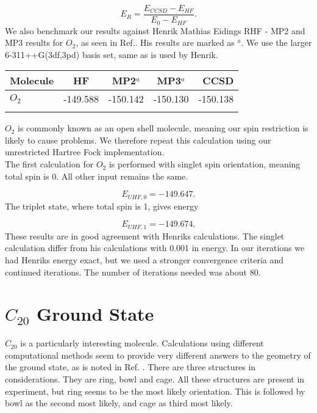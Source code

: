 \begin{equation}
E_R = \frac{E_{CCSD} - E_{HF}}{E_0 - E_{HF}} .
\end{equation}
We also benchmark our results against Henrik Mathias Eidings RHF - MP2 and MP3 results for $O_2$, as seen in Ref.\cite{hmeiding}. His results are marked as $^a$. We use the larger 6-311++G(3df,3pd) basis set, same as is used by Henrik. 

\begin{center}
\begin{tabular}{ l c c c r }
	\hline
  	Molecule & HF & MP2$^a$ & MP3$^a$ & CCSD \\ \hline
  	$O_2$ & -149.588 & -150.142 & -150.130 & -150.138 \\\hline
  	\\
	\end{tabular}
\end{center}

$O_2$ is commonly known as an open shell molecule, meaning our spin restriction is likely to cause problems. We therefore repeat this calculation using our unrestricted Hartree Fock implementation. \\

The first calculation for $O_2$ is performed with singlet spin orientation, meaning total spin is 0. All other input remains the same. 

\begin{equation}
E_{UHF,0} = -149.647 .
\end{equation}
The triplet state, where total spin is 1, gives energy

\begin{equation}
E_{UHF,1} = -149.674  .
\end{equation}
These results are in good agreement with Henriks calculations. The singlet calculation differ from his calculations with 0.001 in energy. In our iterations we had Henriks energy exact, but we used a stronger convergence criteria and continued iterations. The number of iterations needed was about 80. 

\section{$C_{20}$ Ground State} 
$C_{20}$ is a particularly interesting molecule. Calculations using different computational methods seem to provide very different answers to the geometry of the ground state, as is noted in Ref. \cite{c20article_cite_this}. There are three structures in considerations. They are ring, bowl and cage. All these structures are present in experiment, but ring seems to be the most likely orientation. This is followed by bowl as the second most likely, and cage as third most likely.  \\

